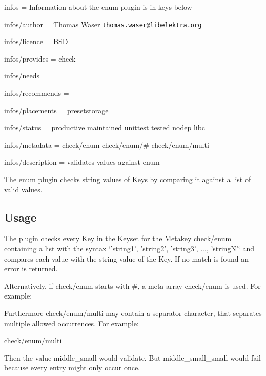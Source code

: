 
\begin{DoxyItemize}
\item infos = Information about the enum plugin is in keys below
\item infos/author = Thomas Waser \href{mailto:thomas.waser@libelektra.org}{\tt thomas.\+waser@libelektra.\+org}
\item infos/licence = B\+S\+D
\item infos/provides = check
\item infos/needs =
\item infos/recommends =
\item infos/placements = presetstorage
\item infos/status = productive maintained unittest tested nodep libc
\item infos/metadata = check/enum check/enum/\# check/enum/multi
\item infos/description = validates values against enum
\end{DoxyItemize}

The enum plugin checks string values of Keys by comparing it against a list of valid values.

\subsection*{Usage}

The plugin checks every Key in the Keyset for the Metakey {\ttfamily check/enum} containing a list with the syntax `'string1', 'string2', 'string3', ..., 'string\+N'` and compares each value with the string value of the Key. If no match is found an error is returned.

Alternatively, if {\ttfamily check/enum} starts with {\ttfamily \#}, a meta array {\ttfamily check/enum} is used. For example\+: 


Furthermore {\ttfamily check/enum/multi} may contain a separator character, that separates multiple allowed occurrences. For example\+: \begin{DoxyVerb}check/enum/multi = _
\end{DoxyVerb}


Then the value {\ttfamily middle\+\_\+small} would validate. But {\ttfamily middle\+\_\+small\+\_\+small} would fail because every entry might only occur once.

